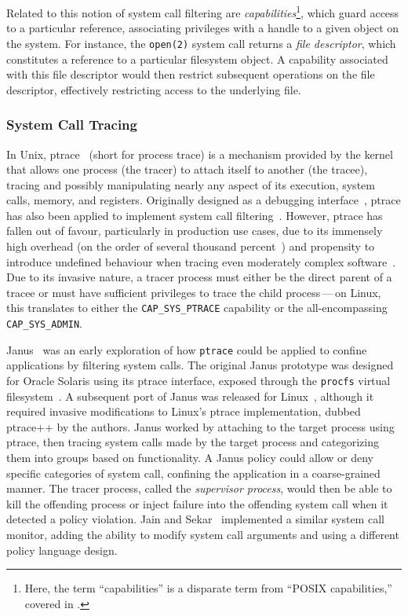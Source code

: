 Related to this notion of system call filtering are \textit{capabilities}\footnote{Here,
the term \enquote{capabilities} is a disparate term from \enquote{POSIX capabilities,} covered in
.}, which guard access to a particular reference, associating privileges with
a handle to a given object on the system. For instance, the \texttt{open(2)} system call
returns a \textit{file descriptor}, which constitutes a reference to a particular
filesystem object. A capability associated with this file descriptor would then restrict
subsequent operations on the file descriptor, effectively restricting access to the
underlying file.

\subsubsection*{System Call Tracing}
\label{sss:ptrace}

In Unix, ptrace~\cite{ptrace, padala2002_ptrace} (short for process trace) is a mechanism
provided by the kernel that allows one process (the tracer) to attach itself to another
(the tracee), tracing and possibly manipulating nearly any aspect of its execution, system
calls, memory, and registers. Originally designed as a debugging interface~\cite{ptrace,
padala2002_ptrace}, ptrace has also been applied to implement system call
filtering~\cite{goldberg96_janus, wagner1999_janus, jain2000_filtering}. However, ptrace
has fallen out of favour, particularly in production use cases, due to its immensely high
overhead (on the order of several thousand percent~\cite{zinke2009_overhead}) and
propensity to introduce undefined behaviour when tracing even moderately complex
software~\cite{swiecki2017_promises}. Due to its invasive nature, a tracer process must
either be the direct parent of a tracee or must have sufficient privileges to trace the
child process\,---\,on Linux, this translates to either the \texttt{CAP\_SYS\_PTRACE}
capability or the all-encompassing \texttt{CAP\_SYS\_ADMIN}.

Janus~\cite{goldberg96_janus, wagner1999_janus} was an early exploration of how
\texttt{ptrace} could be applied to confine applications by filtering system calls.  The
original Janus prototype was designed for Oracle Solaris using its ptrace interface,
exposed through the \texttt{procfs} virtual filesystem~\cite{goldberg96_janus}.
A subsequent port of Janus was released for Linux~\cite{wagner1999_janus}, although it
required invasive modifications to Linux's ptrace implementation, dubbed ptrace++ by the
authors. Janus worked by attaching to the target process using ptrace, then tracing system
calls made by the target process and categorizing them into groups based on functionality.
A Janus policy could allow or deny specific categories of system call, confining the
application in a coarse-grained manner. The tracer process, called the \textit{supervisor
process}, would then be able to kill the offending process or inject failure into the
offending system call when it detected a policy violation.  Jain and
Sekar~\cite{jain2000_filtering} implemented a similar system call monitor, adding the
ability to modify system call arguments and using a different policy language design.

